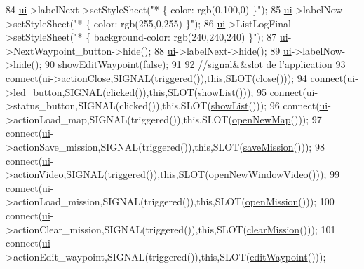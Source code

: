 \begin{DoxyCode}
84     \hyperlink{a00008_a6dc041ef6a2ffb329928d2913e8344e6}{ui}->labelNext->setStyleSheet(\textcolor{stringliteral}{"* \{ color: rgb(0,100,0) \}"});
85     \hyperlink{a00008_a6dc041ef6a2ffb329928d2913e8344e6}{ui}->labelNow->setStyleSheet(\textcolor{stringliteral}{"* \{ color: rgb(255,0,255) \}"});
86     \hyperlink{a00008_a6dc041ef6a2ffb329928d2913e8344e6}{ui}->ListLogFinal->setStyleSheet(\textcolor{stringliteral}{"* \{ background-color: rgb(240,240,240) \}"});
87     \hyperlink{a00008_a6dc041ef6a2ffb329928d2913e8344e6}{ui}->NextWaypoint\_button->hide();
88     \hyperlink{a00008_a6dc041ef6a2ffb329928d2913e8344e6}{ui}->labelNext->hide();
89     \hyperlink{a00008_a6dc041ef6a2ffb329928d2913e8344e6}{ui}->labelNow->hide();
90     \hyperlink{a00008_a35f9f0904259437c4ae21b41c4f759c1}{showEditWaypoint}(\textcolor{keyword}{false});
91 
92     \textcolor{comment}{//signal&&slot de l'application}
93     connect(\hyperlink{a00008_a6dc041ef6a2ffb329928d2913e8344e6}{ui}->actionClose,SIGNAL(triggered()),\textcolor{keyword}{this},SLOT(\hyperlink{a00008_a5ae591df94fc66ccb85cbb6565368bca}{close}()));
94     connect(\hyperlink{a00008_a6dc041ef6a2ffb329928d2913e8344e6}{ui}->led\_button,SIGNAL(clicked()),\textcolor{keyword}{this},SLOT(\hyperlink{a00008_a3bb145fd73ded645d3d83fb8c925f0f8}{showList}()));
95     connect(\hyperlink{a00008_a6dc041ef6a2ffb329928d2913e8344e6}{ui}->status\_button,SIGNAL(clicked()),\textcolor{keyword}{this},SLOT(\hyperlink{a00008_a3bb145fd73ded645d3d83fb8c925f0f8}{showList}()));
96     connect(\hyperlink{a00008_a6dc041ef6a2ffb329928d2913e8344e6}{ui}->actionLoad\_map,SIGNAL(triggered()),\textcolor{keyword}{this},SLOT(\hyperlink{a00008_a7225d8cbcace3eaee988a9d7724c0dbd}{openNewMap}()));
97     connect(\hyperlink{a00008_a6dc041ef6a2ffb329928d2913e8344e6}{ui}->actionSave\_mission,SIGNAL(triggered()),\textcolor{keyword}{this},SLOT(\hyperlink{a00008_a816a9f0cf14cf70a29662387914071f5}{saveMission}()));
98     connect(\hyperlink{a00008_a6dc041ef6a2ffb329928d2913e8344e6}{ui}->actionVideo,SIGNAL(triggered()),\textcolor{keyword}{this},SLOT(\hyperlink{a00008_a03f5e63773125e14f1e32c94420ff7bf}{openNewWindowVideo}()));
99     connect(\hyperlink{a00008_a6dc041ef6a2ffb329928d2913e8344e6}{ui}->actionLoad\_mission,SIGNAL(triggered()),\textcolor{keyword}{this},SLOT(\hyperlink{a00008_a489b8f1d983d32ae8b2e5d9e29aff63a}{openMission}()));
100     connect(\hyperlink{a00008_a6dc041ef6a2ffb329928d2913e8344e6}{ui}->actionClear\_mission,SIGNAL(triggered()),\textcolor{keyword}{this},SLOT(\hyperlink{a00008_ac413685926a24cbbde53d1f3706a3093}{clearMission}()));
101     connect(\hyperlink{a00008_a6dc041ef6a2ffb329928d2913e8344e6}{ui}->actionEdit\_waypoint,SIGNAL(triggered()),\textcolor{keyword}{this},SLOT(\hyperlink{a00008_a9231d60467923911b4ba0d167004588d}{editWaypoint}()));

\end{DoxyCode}
